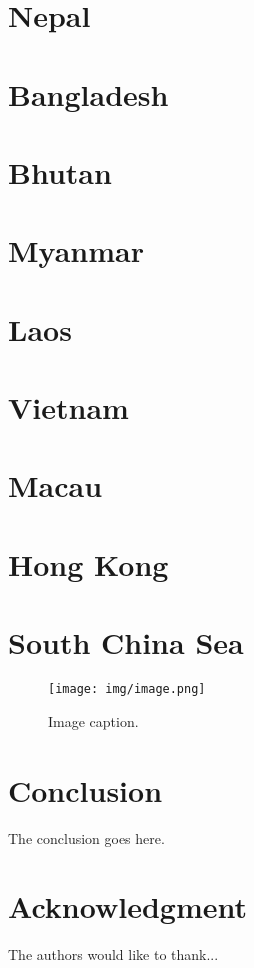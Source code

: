 \documentclass[conference]{IEEEtran}
\begin{document}
	\section{Nepal}
	
	\section{Bangladesh}
	
	\section{Bhutan}
	
	\section{Myanmar}
	
	\section{Laos}
	
	\section{Vietnam}
	
	\section{Macau}
	
	\section{Hong Kong}
	
	\section{South China Sea}
	
	\begin{figure}[t]
		\centering
		\texttt{[image: img/image.png]}
		\caption{Image caption.}
		\label{pic:image}
	\end{figure}
	
	\section{Conclusion}
	The conclusion goes here.
	
	\section*{Acknowledgment}
	The authors would like to thank...
	
	
	
\end{document}
